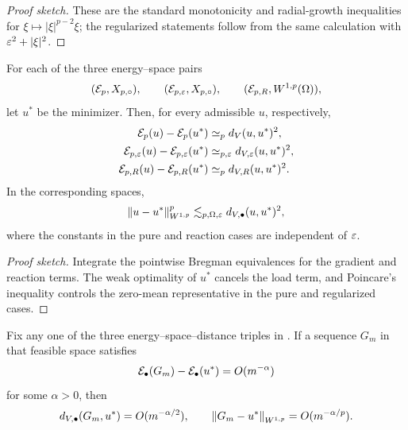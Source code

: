 \begin{proof}[Proof sketch]
These are the standard monotonicity and radial-growth inequalities for $\xi\mapsto|\xi|^{p-2}\xi$; the regularized statements follow from the same calculation with $\varepsilon^2+|\xi|^2$.
\end{proof}

\begin{theorem}
\label{thm:energy-v}
For each of the three energy--space pairs
\[
 (\mathcal{E}_p,X_{p,\circ}),\qquad(\mathcal{E}_{p,\varepsilon},X_{p,\circ}),\qquad
 (\mathcal{E}_{p,R},W^{1,p}(\Omega)),
\]
let \(u^*\) be the minimizer. Then, for every admissible \(u\), respectively,
\begin{align}
 \mathcal{E}_p(u)-\mathcal{E}_p(u^*)&\simeq_p d_V(u,u^*)^2,
 \label{eq:pure-equiv}\\
 \mathcal{E}_{p,\varepsilon}(u)-\mathcal{E}_{p,\varepsilon}(u^*)&\simeq_{p,\varepsilon}d_{V,\varepsilon}(u,u^*)^2,
 \label{eq:reg-equiv}\\
 \mathcal{E}_{p,R}(u)-\mathcal{E}_{p,R}(u^*)&\simeq_p d_{V,R}(u,u^*)^2.
 \label{eq:reaction-equiv}
\end{align}
In the corresponding spaces,
\begin{equation}
 \left\lVert u-u^*\right\rVert_{W^{1,p}}^p
 \lesssim_{p,\Omega,\varepsilon}d_{V,\bullet}(u,u^*)^2,
 \label{eq:w1p-control}
\end{equation}
where the constants in the pure and reaction cases are independent of \(\varepsilon\).
\end{theorem}

\begin{proof}[Proof sketch]
Integrate the pointwise Bregman equivalences for the gradient and reaction terms.  The weak optimality of $u^*$ cancels the load term, and Poincare's inequality controls the zero-mean representative in the pure and regularized cases.
\end{proof}

\begin{corollary}
\label{cor:metric-rates}
Fix any one of the three energy--space--distance triples in . If a sequence
\(G_m\) in that feasible space satisfies
 \begin{equation}
 \mathcal{E}_\bullet(G_m)-\mathcal{E}_\bullet(u^*)=O(m^{-\alpha})
 \label{eq:assumed-energy-rate}
 \end{equation}
for some \(\alpha>0\), then
 \begin{equation}
 d_{V,\bullet}(G_m,u^*)=O(m^{-\alpha/2}),
 \qquad
 \left\lVert G_m-u^*\right\rVert_{W^{1,p}}=O(m^{-\alpha/p}).
\label{eq:metric-rates}
 \end{equation}
\end{corollary}

